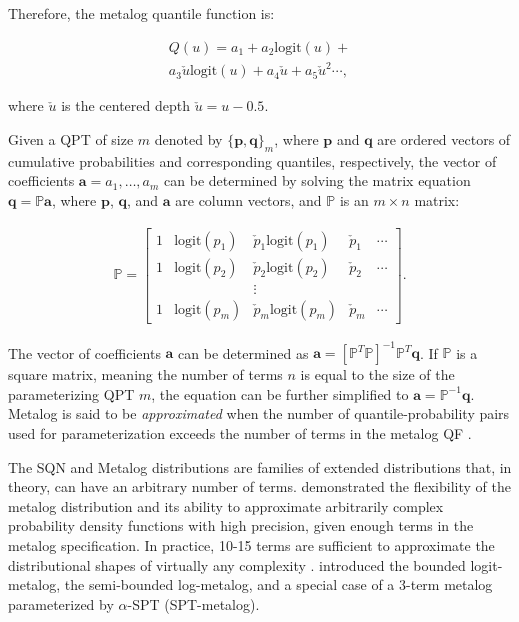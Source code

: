 \documentclass[
  fleqn,
  deca,
  blindrev
]{informs4}
\begin{document}
Therefore, the metalog quantile function is:

\[
\begin{gathered}
Q(u)= a_1+a_2\text{logit}(u)+\\
a_3\check{u}\text{logit}(u)+a_4\check{u}+a_5\check{u}^2\cdots,
\end{gathered}
\]

where \(\check{u}\) is the centered depth \(\check{u}=u-0.5\).

Given a QPT of size \(m\) denoted by \(\{\mathbf{p}, \mathbf{q}\}_m\),
where \(\mathbf{p}\) and \(\mathbf{q}\) are ordered vectors of
cumulative probabilities and corresponding quantiles, respectively, the
vector of coefficients \(\mathbf{a}={a_1,\dots,a_m}\) can be determined
by solving the matrix equation \(\mathbf{q}=\mathbb{P}\mathbf{a}\),
where \(\mathbf{p}\), \(\mathbf{q}\), and \(\mathbf{a}\) are column
vectors, and \(\mathbb{P}\) is an \(m \times n\) matrix:

\[
\begin{gathered}
\mathbb{P} = \left[\begin{array}{lllll}
1  &\text{logit}(p_1) &\check{p}_1\text{logit}(p_1) &\check{p}_1 &\cdots\\
1  &\text{logit}(p_2) &\check{p}_2\text{logit}(p_2) &\check{p}_2 &\cdots\\
   &                  &\vdots\\
1  &\text{logit}(p_m) &\check{p}_m\text{logit}(p_m) &\check{p}_m &\cdots
\end{array}\right].
\end{gathered}
\]

The vector of coefficients \(\mathbf{a}\) can be determined as
\(\mathbf{a}=[\mathbb{P}^{T}\mathbb{P}]^{-1}\mathbb{P}^{T}\mathbf{q}\).
If \(\mathbb{P}\) is a square matrix, meaning the number of terms \(n\)
is equal to the size of the parameterizing QPT \(m\), the equation can
be further simplified to \(\mathbf{a}=\mathbb{P}^{-1}\mathbf{q}\).
Metalog is said to be \emph{approximated} when the number of
quantile-probability pairs used for parameterization exceeds the number
of terms in the metalog QF
\citep{keelin2016MetalogDistributions, perepolkin2024HybridElicitationQuantileparametrized}.

The SQN and Metalog distributions are families of extended distributions
that, in theory, can have an arbitrary number of terms.
\citet{keelin2016MetalogDistributions} demonstrated the flexibility of
the metalog distribution and its ability to approximate arbitrarily
complex probability density functions with high precision, given enough
terms in the metalog specification. In practice, 10-15 terms are
sufficient to approximate the distributional shapes of virtually any
complexity \citep{keelin2021MetalogDistributionsVirtually}.
\citet{keelin2016MetalogDistributions} introduced the bounded
logit-metalog, the semi-bounded log-metalog, and a special case of a
3-term metalog parameterized by \(\alpha\)-SPT (SPT-metalog).
\end{document}
